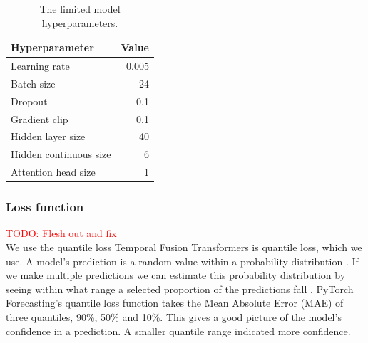         \begin{table}[ht!]
        \begin{center}
        \caption{The limited model hyperparameters.
        \label{tab:lim_params}}
        \vspace{0.5cm}
        \begin{tabular}{|l|r|}
        \hline
        \textbf{Hyperparameter} & \textbf{Value} \\ \hline
        Learning rate            & 0.005         \\ \hline
        Batch size              & 24            \\ \hline
        Dropout                 & 0.1            \\ \hline
        Gradient clip           & 0.1           \\ \hline
        Hidden layer size            & 40         \\ \hline
        Hidden continuous size & 6         \\ \hline
        Attention head size    & 1         \\ \hline
        \end{tabular}
        
        \end{center}
        \end{table}
    
    \subsubsection{Loss function}\label{sec:loss_function}
    \textcolor{red}{TODO: Flesh out and fix}\\
    We use the quantile loss  Temporal Fusion Transformers is quantile loss, which we use.
    A model's prediction is a random value within a probability distribution \cite{wen_multi-horizon_2018}. If we make multiple predictions we can estimate this probability distribution by seeing within what range a selected proportion of the predictions fall \cite{koenker_quantile_2001}. PyTorch Forecasting's quantile loss function takes the Mean Absolute Error (MAE) of three quantiles, 90\%, 50\% and 10\%. This gives a good picture of the model's confidence in a prediction. A smaller quantile range indicated more confidence.
    